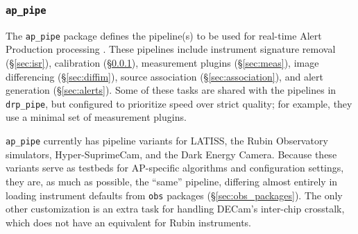 \subsubsection{\texttt{ap\_pipe}}

The \texttt{ap\_pipe} package defines the pipeline(s) to be used for real-time Alert Production processing \citep{DMTN-219}.
These pipelines include instrument signature removal (\S\ref{sec:isr}), calibration (\S\ref{}), measurement plugins (\S\ref{sec:meas}), image differencing (\S\ref{sec:diffim}), source association (\S\ref{sec:association}), and alert generation (\S\ref{sec:alerts}).
Some of these tasks are shared with the pipelines in \texttt{drp\_pipe}, but configured to prioritize speed over strict quality; for example, they use a minimal set of measurement plugins.

\texttt{ap\_pipe} currently has pipeline variants for LATISS, the Rubin Observatory simulators, Hyper-SuprimeCam, and the Dark Energy Camera.
Because these variants serve as testbeds for AP-specific algorithms and configuration settings, they are, as much as possible, the ``same'' pipeline, differing almost entirely in loading instrument defaults from \texttt{obs} packages (\S\ref{sec:obs_packages}).
The only other customization is an extra task for handling DECam's inter-chip crosstalk, which does not have an equivalent for Rubin instruments.
